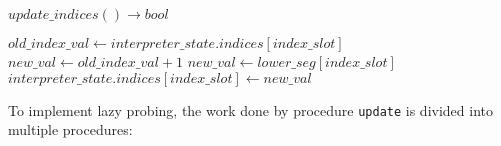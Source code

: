 \begin{algorithm}  {$update\_indices() \rightarrow bool$}
\singlespacing

\begin{algorithmic}[1]
\State $old\_index\_val \gets
interpreter\_state.indices[index\_slot]$
\State $new\_val \gets old\_index\_val + 1$
  \State $new\_val \gets lower\_seg[index\_slot]$
\EndIf
\State $interpreter\_state.indices[index\_slot] \gets new\_val$
\EndFor
{}
  \State {}
\Else
  \State {}
\EndIf
\EndProcedure
\end{algorithmic}
\end{algorithm}

To implement lazy probing, the work done by procedure \texttt{update} is divided
into multiple procedures:

